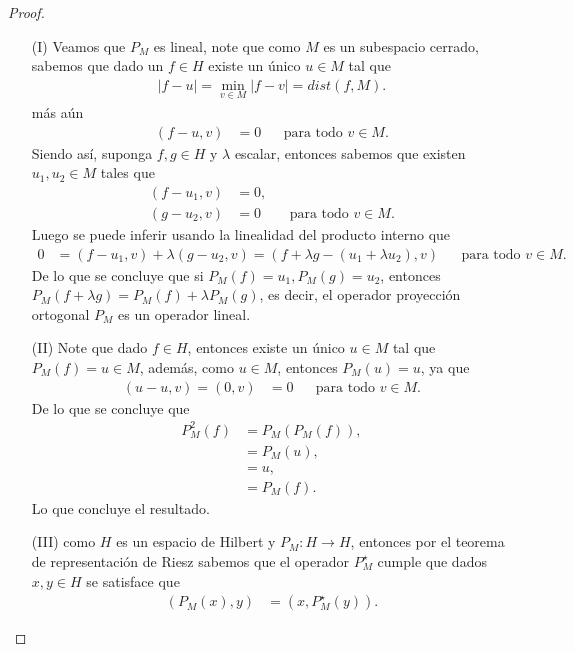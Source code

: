 \begin{proof} 
  \begin{enumerate}
    \item[(I)] Veamos que $P_{M}$ es lineal, note que como $M$ es un subespacio cerrado, sabemos que dado un $f\in H$ existe un único $u\in M$ tal que
      \begin{align*}
        |f-u|=\min_{v\in M}|f-v|=dist(f,M).
      \end{align*}
      más aún
      \begin{align*}
        (f-u,v)&= 0&&\text{para todo $v\in M$.}
      \end{align*}
      Siendo así, suponga $f,g\in H$ y $\lambda$ escalar, entonces sabemos que existen $u_{1},u_{2}\in M$ tales que  
      \begin{align*}
        (f-u_{1},v)&=0,\\
        (g-u_{2},v)&=0&&\text{para todo $v\in M$.}
      \end{align*}
      Luego se puede inferir usando la linealidad del producto interno que
      \begin{align*}
        0&=(f-u_{1},v)+\lambda(g-u_{2},v)=(f+\lambda g-(u_{1}+\lambda u_{2}),v) &&\text{para todo $v\in M$.}
      \end{align*}
      De lo que se concluye que si $P_{M}(f)=u_{1}, P_{M}(g)=u_{2}$, entonces $P_{M}(f+\lambda g)=P_{M}(f)+\lambda P_{M}(g)$, es decir, el operador proyección ortogonal $P_{M}$ es un operador lineal. 
    \item[(II)] Note que dado $f\in H$, entonces existe un único $u\in M$ tal que $P_{M}(f)=u\in M$, además, como $u\in M$, entonces $P_{M}(u)=u$, ya que
    \begin{align*}
      (u-u,v)=(0,v)&=0&&\text{para todo $v\in M$.}
    \end{align*}
    De lo que se concluye que
    \begin{align*}
      P_{M}^{2}(f)&=P_{M}\left( P_{M}(f) \right),\\
      &=P_{M}(u),\\
      &=u,\\
      &=P_{M}(f).
    \end{align*}
    Lo que concluye el resultado.
    \item[(III)] como $H$ es un espacio de Hilbert y $P_{M}:H\to H$, entonces por el teorema de representación de Riesz sabemos que el operador $P_{M}^{\star}$ cumple que dados $x,y\in H$ se satisface que 
      \begin{align*}
        \left(P_{M}(x),y\right)&=\left(x,P_{M}^{\star}(y)\right).

\end{align*}
\end{enumerate}
\end{proof}
